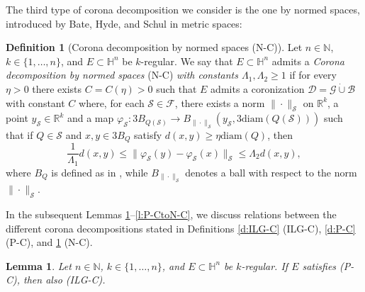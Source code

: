 \documentclass[12pt]{amsart}
\newcommand{\R}{\mathbb R}
\renewcommand{\H}{\mathbb H}
\numberwithin{equation}{section}
\theoremstyle{plain}
\newtheorem{lemma}[theorem]{Lemma}
\theoremstyle{definition}
\newtheorem{definition}[theorem]{Definition}
\theoremstyle{remark}
\newtheorem{remark}[theorem]{Remark}
\begin{document}

The third type of corona decomposition we consider is the one by normed spaces, introduced by Bate, Hyde, and Schul \cite[Definitions 6.4.1, 6.4.2]{Bate} in metric spaces:
\begin{definition}[Corona decomposition by normed spaces (N-C)]\label{d:N-C} Let $n\in \mathbb{N}$, $k\in \{1,\ldots,n\}$, and $E\subset \mathbb{H}^n$ be $k$-regular. 
We say that $E\subset \H^n$ admits a \textit{Corona decomposition by normed spaces} (N-C) \textit{with constants $\Lambda_1,\Lambda_2\geq 1$} if for every $\eta>0$ there exists $C=C(\eta)>0$ such that $E$ admits a coronization $\mathcal{D}=\mathcal{G}\dot{\cup}\mathcal{B}$ with constant $C$  
where,  for each $\mathcal S\in\mathcal F$,
 there exists a norm $\|\cdot\|_\mathcal S$ on $\R^k$, a point $y_\mathcal S\in\R^k$ and a map $\varphi_\mathcal S: 3B_{Q(\mathcal S)}\to B_{\|\cdot\|_{\mathcal{S}}}(y_\mathcal S, 3 \mathrm{diam}(Q(\mathcal S))) $ such that if $ Q\in\mathcal S$ and $x,y\in 3B_Q$ satisfy $d(x,y)\geq \eta \mathrm{diam}(Q)$, then
     \[\frac{1}{\Lambda _1}d(x,y)\leq \|\varphi_\mathcal S(y)-\varphi_\mathcal S (x)\|_\mathcal S\leq \Lambda_2 d(x,y),\] 
     where  $B_Q$ is defined as in \cite{Bate}, while $B_{\|\cdot\|_{\mathcal{S}}}$ denotes a ball with respect to the norm $\|\cdot\|_{\mathcal{S}}$.
\end{definition}
In the subsequent Lemmas \ref{l:PCimpliesILGC}--\ref{l:P-CtoN-C}, we discuss relations between the different corona decompositions stated in Definitions \ref{d:ILG-C} (ILG-C), \ref{d:P-C} (P-C), and \ref{d:N-C} (N-C). 


\begin{lemma}\label{l:PCimpliesILGC} Let $n\in \mathbb{N}$, $k\in \{1,\ldots,n\}$, and $E\subset \mathbb{H}^n$ be $k$-regular. If $E$ satisfies (P-C), then also (ILG-C).    
\end{lemma}
\end{document}
